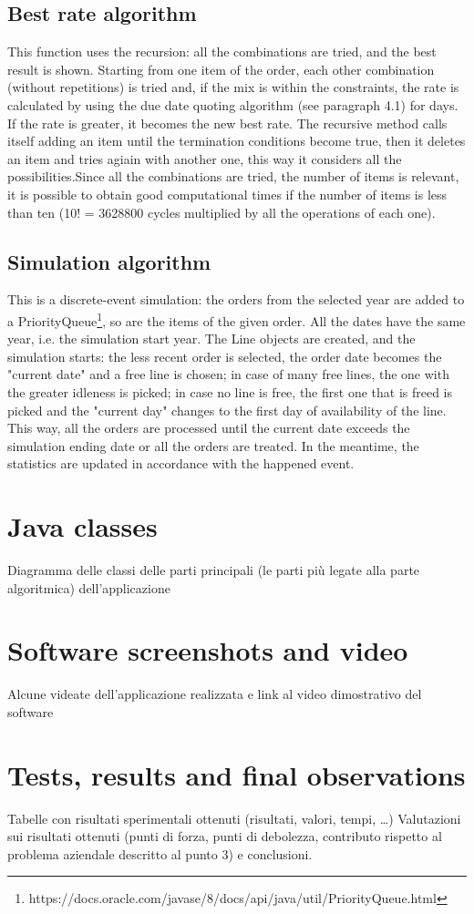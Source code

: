 \documentclass[a4paper,12pt]{article}
\begin{document}
\subsection{Best rate algorithm}
This function uses the recursion: all the combinations are tried, and the best result is shown. Starting from one item of the order, each other combination (without repetitions) is tried and, if the mix is within the constraints, the rate is calculated by using the due date quoting algorithm (see paragraph 4.1) for days. If the rate is greater, it becomes the new best rate. The recursive method calls itself adding an item until the termination conditions become true, then it deletes an item and tries agiain with another one, this way it considers all the possibilities.Since all the combinations are tried, the number of items is relevant, it is possible to obtain good computational times if the number of items is less than ten (10! =  3628800 cycles multiplied by all the operations of each one). 

\subsection{Simulation algorithm}
 This is a discrete-event simulation: the orders from the selected year are added to a PriorityQueue\footnote{https://docs.oracle.com/javase/8/docs/api/java/util/PriorityQueue.html}, so are the items of the given order. All the dates have the same year, i.e. the simulation start year. The Line objects are created, and the simulation starts: the less recent order is selected, the order date becomes the "current date" and a free line is chosen; in case of many free lines, the one with the greater idleness is picked; in case no line is free, the first one that is freed is picked and the "current day" changes to the first day of availability of the line. This way, all the orders are processed until the current date exceeds the simulation ending date or all the orders are treated. In the meantime, the statistics are updated in accordance with the happened event.

\newpage
\section{Java classes}
Diagramma delle classi delle parti principali (le parti più legate alla parte algoritmica) dell’applicazione

\newpage
\section{Software screenshots and video}
Alcune videate dell’applicazione realizzata e link al video dimostrativo del software

\newpage
\section{Tests, results and final observations}
Tabelle con risultati sperimentali ottenuti (risultati, valori, tempi, …)
Valutazioni sui risultati ottenuti (punti di forza, punti di debolezza, contributo rispetto al problema aziendale descritto al punto 3) e conclusioni.
\end{document}
